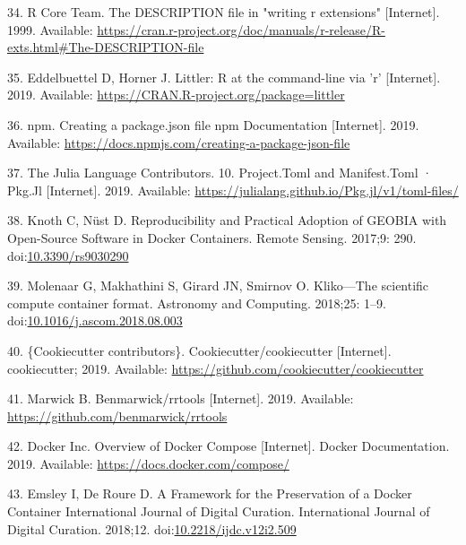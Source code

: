 \documentclass[10pt,letterpaper]{article}
\begin{document}
\leavevmode\hypertarget{ref-r_core_team_description_1999}{}%
34. R Core Team. The DESCRIPTION file in "writing r extensions"
{[}Internet{]}. 1999. Available:
\url{https://cran.r-project.org/doc/manuals/r-release/R-exts.html\#The-DESCRIPTION-file}

\leavevmode\hypertarget{ref-eddelbuettel_littler_2019}{}%
35. Eddelbuettel D, Horner J. Littler: R at the command-line via 'r'
{[}Internet{]}. 2019. Available:
\url{https://CRAN.R-project.org/package=littler}

\leavevmode\hypertarget{ref-npm_creating_2019}{}%
36. npm. Creating a package.json file npm Documentation {[}Internet{]}.
2019. Available:
\url{https://docs.npmjs.com/creating-a-package-json-file}

\leavevmode\hypertarget{ref-julia_tomls_2019}{}%
37. The Julia Language Contributors. 10. Project.Toml and Manifest.Toml
· Pkg.Jl {[}Internet{]}. 2019. Available:
\url{https://julialang.github.io/Pkg.jl/v1/toml-files/}

\leavevmode\hypertarget{ref-knoth_reproducibility_2017}{}%
38. Knoth C, Nüst D. Reproducibility and Practical Adoption of GEOBIA
with Open-Source Software in Docker Containers. Remote Sensing. 2017;9:
290. doi:\href{https://doi.org/10.3390/rs9030290}{10.3390/rs9030290}

\leavevmode\hypertarget{ref-molenaar_klikoscientific_2018}{}%
39. Molenaar G, Makhathini S, Girard JN, Smirnov O. Kliko---The
scientific compute container format. Astronomy and Computing. 2018;25:
1--9.
doi:\href{https://doi.org/10.1016/j.ascom.2018.08.003}{10.1016/j.ascom.2018.08.003}

\leavevmode\hypertarget{ref-cookiecutter_contributors_cookiecutter_2019}{}%
40. \{Cookiecutter contributors\}. Cookiecutter/cookiecutter
{[}Internet{]}. cookiecutter; 2019. Available:
\url{https://github.com/cookiecutter/cookiecutter}

\leavevmode\hypertarget{ref-marwick_rrtools_2019}{}%
41. Marwick B. Benmarwick/rrtools {[}Internet{]}. 2019. Available:
\url{https://github.com/benmarwick/rrtools}

\leavevmode\hypertarget{ref-docker-compose_2019}{}%
42. Docker Inc. Overview of Docker Compose {[}Internet{]}. Docker
Documentation. 2019. Available: \url{https://docs.docker.com/compose/}

\leavevmode\hypertarget{ref-emsley_framework_2018}{}%
43. Emsley I, De Roure D. A Framework for the Preservation of a Docker
Container International Journal of Digital Curation. International
Journal of Digital Curation. 2018;12.
doi:\href{https://doi.org/10.2218/ijdc.v12i2.509}{10.2218/ijdc.v12i2.509}
\end{document}
